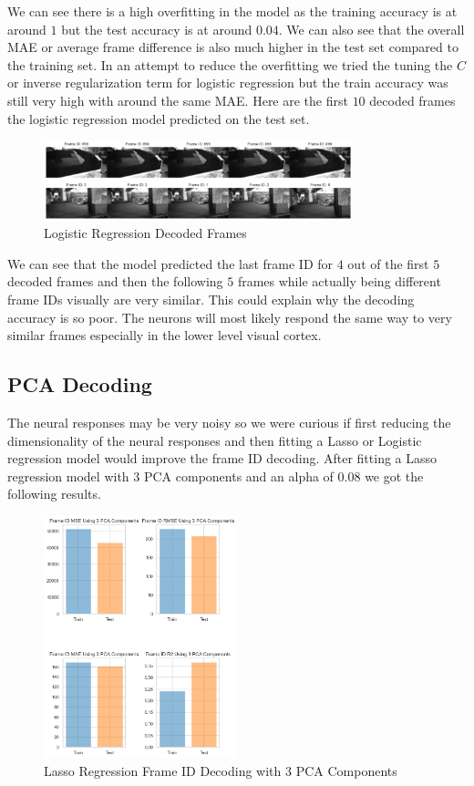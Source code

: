 \documentclass[12pt, letterpaper]{article}
\begin{document}
We can see there is a high overfitting in the model as the training accuracy is at around $1$ but the test accuracy is at around $0.04$. We can also see that the overall MAE or average frame difference is also much higher in the test set compared to the training set. In an attempt to reduce the overfitting we tried the tuning the $C$ or inverse regularization term for logistic regression but the train accuracy was still very high with around the same MAE. Here are the first $10$ decoded frames the logistic regression model predicted on the test set.

\begin{figure}[H]
    \centering
    \includegraphics[width=0.8\textwidth]{neuropixel_logistic_reg_video.png}
    \caption{Logistic Regression Decoded Frames}
    \label{fig:neuropixel_logistic_frame_id_decoded}
\end{figure}

We can see that the model predicted the last frame ID for $4$ out of the first $5$ decoded frames and then the following $5$ frames while actually being different frame IDs visually are very similar. This could explain why the decoding accuracy is so poor. The neurons will most likely respond the same way to very similar frames especially in the lower level visual cortex.

\subsection{PCA Decoding}
The neural responses may be very noisy so we were curious if first reducing the dimensionality of the neural responses and then fitting a Lasso or Logistic regression model would improve the frame ID decoding. After fitting a Lasso regression model with $3$ PCA components and an alpha of $0.08$ we got the following results.

\begin{figure}[H]
    \centering
    \includegraphics[width=0.5\textwidth]{frame_id_metrics_lasso_using_pca.08.png}
    \caption{Lasso Regression Frame ID Decoding with 3 PCA Components}
    \label{fig:pca_frame_id_lasso}
\end{figure}
\end{document}
